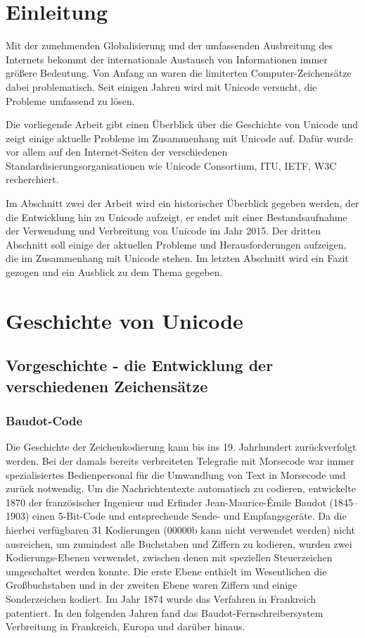 \section{Einleitung}
Mit der zunehmenden Globalisierung und der umfassenden Ausbreitung des Internets bekommt der internationale Austausch von Informationen immer größere Bedeutung. Von Anfang an waren die limiterten Computer-Zeichensätze dabei problematisch. Seit einigen Jahren wird mit Unicode versucht, die Probleme umfassend zu lösen.

Die vorliegende Arbeit gibt einen Überblick über die Geschichte von Unicode und zeigt einige aktuelle Probleme im Zusammenhang mit Unicode auf.
Dafür wurde vor allem auf den Internet-Seiten der verschiedenen Standardisierungsorganisationen wie Unicode Consortium, ITU, IETF, W3C recherchiert.

Im Abschnitt zwei der Arbeit wird ein historischer Überblick gegeben werden, der die Entwicklung hin zu Unicode aufzeigt, er endet mit einer Bestandsaufnahme der Verwendung und Verbreitung von Unicode im Jahr 2015. Der dritten Abschnitt soll einige der aktuellen Probleme und Herausforderungen aufzeigen, die im Zusammenhang mit Unicode stehen. Im letzten Abschnitt wird ein Fazit gezogen und ein Ausblick zu dem Thema gegeben.

\section{Geschichte von Unicode}

\subsection{Vorgeschichte - die Entwicklung der verschiedenen Zeichensätze}

\subsubsection{Baudot-Code}
Die Geschichte der Zeichenkodierung kann bis ins 19. Jahrhundert zurückverfolgt werden.
Bei der damals bereits verbreiteten Telegrafie mit Morsecode war immer spezialisiertes Bedienpersonal für die Umwandlung von Text in Morsecode und zurück notwendig.
Um die Nachrichtentexte automatisch zu codieren, entwickelte 1870 der französischer Ingenieur und Erfinder Jean-Maurice-Émile Baudot (1845–1903) einen 5-Bit-Code und entsprechende Sende- und Empfangsgeräte. Da die hierbei verfügbaren 31 Kodierungen (00000b kann nicht verwendet werden) nicht ausreichen, um zumindest alle Buchstaben und Ziffern zu kodieren, wurden zwei Kodierungs-Ebenen verwendet, zwischen denen mit speziellen Steuerzeichen umgeschaltet werden konnte. Die erste Ebene enthielt im Wesentlichen die Großbuchstaben und in der zweiten Ebene waren Ziffern und einige Sonderzeichen kodiert.
Im Jahr 1874 wurde das Verfahren in Frankreich patentiert. In den folgenden Jahren fand das Baudot-Fernschreibersystem Verbreitung in Frankreich, Europa und darüber hinaus.

